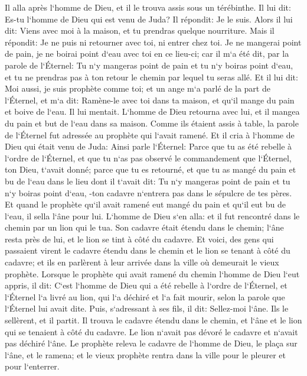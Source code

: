 \verse Il alla après l`homme de Dieu, et il le trouva assis sous un térébinthe. Il lui dit: Es-tu l`homme de Dieu qui est venu de Juda? Il répondit: Je le suis. 
\verse Alors il lui dit: Viens avec moi à la maison, et tu prendras quelque nourriture. 
\verse Mais il répondit: Je ne puis ni retourner avec toi, ni entrer chez toi. Je ne mangerai point de pain, je ne boirai point d`eau avec toi en ce lieu-ci; 
\verse car il m`a été dit, par la parole de l`Éternel: Tu n`y mangeras point de pain et tu n`y boiras point d`eau, et tu ne prendras pas à ton retour le chemin par lequel tu seras allé. 
\verse Et il lui dit: Moi aussi, je suis prophète comme toi; et un ange m`a parlé de la part de l`Éternel, et m`a dit: Ramène-le avec toi dans ta maison, et qu`il mange du pain et boive de l`eau. Il lui mentait. 
\verse L`homme de Dieu retourna avec lui, et il mangea du pain et but de l`eau dans sa maison. 
\verse Comme ils étaient assis à table, la parole de l`Éternel fut adressée au prophète qui l`avait ramené. 
\verse Et il cria à l`homme de Dieu qui était venu de Juda: Ainsi parle l`Éternel: Parce que tu as été rebelle à l`ordre de l`Éternel, et que tu n`as pas observé le commandement que l`Éternel, ton Dieu, t`avait donné; 
\verse parce que tu es retourné, et que tu as mangé du pain et bu de l`eau dans le lieu dont il t`avait dit: Tu n`y mangeras point de pain et tu n`y boiras point d`eau, -ton cadavre n`entrera pas dans le sépulcre de tes pères. 
\verse Et quand le prophète qu`il avait ramené eut mangé du pain et qu`il eut bu de l`eau, il sella l`âne pour lui. 
\verse L`homme de Dieu s`en alla: et il fut rencontré dans le chemin par un lion qui le tua. Son cadavre était étendu dans le chemin; l`âne resta près de lui, et le lion se tint à côté du cadavre. 
\verse Et voici, des gens qui passaient virent le cadavre étendu dans le chemin et le lion se tenant à côté du cadavre; et ils en parlèrent à leur arrivée dans la ville où demeurait le vieux prophète. 
\verse Lorsque le prophète qui avait ramené du chemin l`homme de Dieu l`eut appris, il dit: C`est l`homme de Dieu qui a été rebelle à l`ordre de l`Éternel, et l`Éternel l`a livré au lion, qui l`a déchiré et l`a fait mourir, selon la parole que l`Éternel lui avait dite. 
\verse Puis, s`adressant à ses fils, il dit: Sellez-moi l`âne. Ils le sellèrent, 
\verse et il partit. Il trouva le cadavre étendu dans le chemin, et l`âne et le lion qui se tenaient à côté du cadavre. Le lion n`avait pas dévoré le cadavre et n`avait pas déchiré l`âne. 
\verse Le prophète releva le cadavre de l`homme de Dieu, le plaça sur l`âne, et le ramena; et le vieux prophète rentra dans la ville pour le pleurer et pour l`enterrer. 
